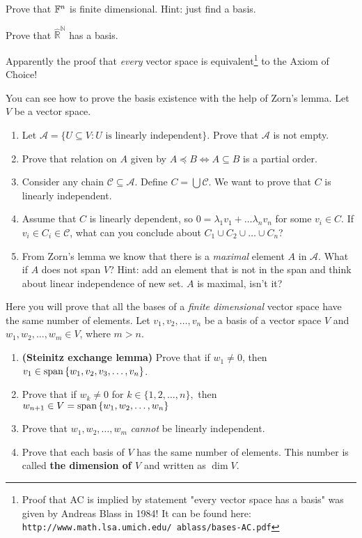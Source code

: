 \begin{prob}
  Prove that $\mathbb F^n$ is finite dimensional. Hint: just find a basis.
\end{prob}

\begin{prob}
  Prove that $\hat{\mathbb R}^{\mathbb N}$ has a basis.
\end{prob}

Apparently the proof that \textit{every} vector space is equivalent\footnote{Proof that AC is implied by statement "every vector space has a basis"
was given by Andreas Blass in 1984! It can be found here:
\texttt{http://www.math.lsa.umich.edu/~ablass/bases-AC.pdf}} to the Axiom of Choice!

\begin{exercise}
  You can see how to prove the basis existence with the help of Zorn's lemma. Let $V$ be a vector space.
  \begin{enumerate}
    \item Let $\mathcal A = \{U\subseteq V : U\text{ is linearly independent}\}$. Prove that $\mathcal A$ is not empty.
    \item Prove that relation on $A$ given by $A\preceq B \Leftrightarrow A\subseteq B$ is a partial order.
    \item Consider any chain $\mathcal C\subseteq \mathcal A$. Define $C=\bigcup\mathcal C$. We want to prove that $C$ is linearly independent.
    \item Assume that $C$ is linearly dependent, so $0=\lambda_1v_1+\dots\lambda_nv_n$ for some $v_i\in C$. If $v_i\in C_i\in \mathcal C$, what
      can you conclude about $C_1\cup C_2\cup\dots\cup C_n$?
    \item From Zorn's lemma we know that there is a \textit{maximal} element $A$ in $\mathcal A$. What if $A$ does not span $V$? Hint: add an element
      that is not in the span and think about linear independence of new set. $A$ is maximal, isn't it?
  \end{enumerate}
\end{exercise}

\begin{prob}
  Here you will prove that all the bases of a \textit{finite dimensional} vector space have the same number of elements. Let $v_1, v_2,\dots, v_n$ be a basis of a vector space $V$ and $w_1,w_2,\dots,w_m\in V$, where $m > n$.
  \begin{enumerate}
    \item \textbf{(Steinitz exchange lemma)} Prove that if $w_1\neq 0$, then $v_1\in \text{span\,} \{w_1, v_2, v_3, \dots,v_n\}$.
    \item Prove that if $w_k\neq 0$ for $k\in\{1, 2, \dots, n\},$ then $w_{n+1}\in V=\text{span\,}\{w_1, w_2, \dots, w_n\}$
    \item Prove that $w_1, w_2, \dots, w_m$ \textit{cannot} be linearly independent.
    \item Prove that each basis of $V$ has the same number of elements. This number is called \textbf{the dimension of $V$} and written as $\dim V$.
  \end{enumerate}
\end{prob}


